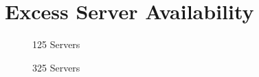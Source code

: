 \documentclass[thesis,proposal]{umassthesis}  %
\begin{document}
\section{Excess Server Availability}

\begin{figure}
	\begin{minipage}{0.49\textwidth}
        \caption{125 Servers}\label{Fig:125serverexcess}
    \end{minipage}
    \begin{minipage}{0.49\textwidth}
        \caption{325 Servers}\label{Fig:325serverexcess}
    \end{minipage}
\end{figure}
\end{document}
